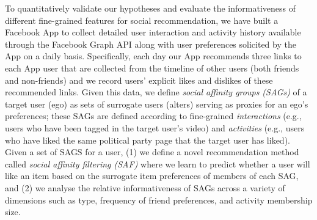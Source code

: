 To quantitatively validate our hypotheses and evaluate the
informativeness of different fine-grained features for social
recommendation, we have built a Facebook App to collect detailed user
interaction and activity history available through the Facebook Graph
API along with user preferences solicited by the App on a daily basis.
Specifically, each day our App recommends three links to each App user
that are collected from the timeline of other users (both friends and
non-friends) and we record users' explicit likes and dislikes of these
recommended links.  Given this data, we define \emph{social affinity
groups (SAGs)} of a target user (ego) as sets of surrogate users
(alters) serving as proxies for an ego's preferences; these SAGs are
defined according to fine-grained
\emph{interactions} (e.g., users who have been tagged in the target user's
video) and \emph{activities} (e.g., users who have liked the same
political party page that the target user has liked).  Given a set of
SAGS for a user, (1) we define a novel recommendation method called
{\em social affinity filtering (SAF)} where we learn to predict
whether a user will like an item based on the surrogate item
preferences of members of each SAG, and (2) we analyse the relative
informativeness of SAGs across a variety of dimensions such as type,
frequency of friend preferences, and activity membership size.


